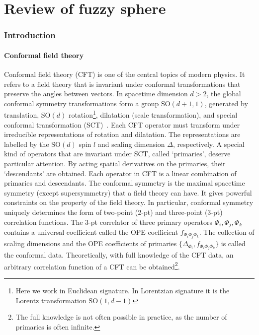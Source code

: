 \documentclass{timesjhep}
\begin{document}
\cleardoublepage
\part{Review of fuzzy sphere}
\label{pt:intro}

\section{Introduction}
\label{sec:intro}

\subsection{Conformal field theory}

Conformal field theory (CFT) is one of the central topics of modern physics. It refers to a field theory that is invariant under conformal transformations that preserve the angles between vectors. In spacetime dimension $d>2$, the global conformal symmetry transformations form a group $\mathrm{SO}(d+1,1)$, generated by translation, $\mathrm{SO}(d)$ rotation\footnote{Here we work in Euclidean signature. In Lorentzian signature it is the Lorentz transformation $\mathrm{SO}(1,d-1)$}, dilatation (scale transformation), and special conformal transformation (SCT)~\cite{Rychkov2016CFT,SimmonsDuffin2016CFT}. Each CFT operator must transform under irreducible representations of rotation and dilatation. The representations are labelled by the $\mathrm{SO}(d)$ spin $l$ and scaling dimension $\Delta$, respectively. A special kind of operators that are invariant under SCT, called `primaries', deserve particular attention. By acting spatial derivatives on the primaries, their `descendants' are obtained. Each operator in CFT is a linear combination of primaries and descendants. The conformal symmetry is the maximal spacetime symmetry (except supersymmetry) that a field theory can have. It gives powerful constraints on the property of the field theory. In particular, conformal symmetry uniquely determines the form of two-point (2-pt) and three-point (3-pt) correlation functions. The 3-pt correlator of three primary operators $\Phi_i,\Phi_j,\Phi_k$ contains a universal coefficient called the OPE coefficient $f_{\Phi_i\Phi_j\Phi_k}$. The collection of scaling dimensions and the OPE coefficients of primaries $\{\Delta_{\Phi_i},f_{\Phi_i\Phi_j\Phi_k}\}$ is called the conformal data. Theoretically, with full knowledge of the CFT data, an arbitrary correlation function of a CFT can be obtained\footnote{The full knowledge is not often possible in practice, as the number of primaries is often infinite.}.
\end{document}
